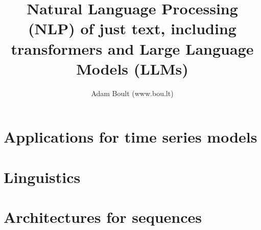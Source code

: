 \documentclass[oneside]{book}
\begin{document}
\author{Adam Boult (www.bou.lt)}
\title{Natural Language Processing (NLP) of just text, including transformers and Large Language Models (LLMs)}
\maketitle

\setcounter{tocdepth}{0}
\tableofcontents



\part{Applications for time series models}





\part{Linguistics}




\part{Architectures for sequences}



\end{document}
